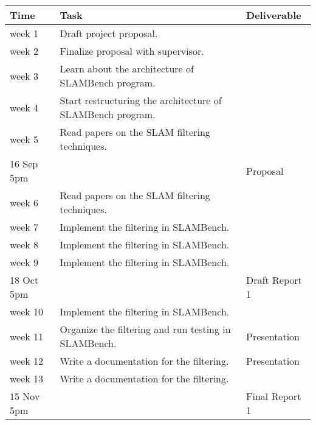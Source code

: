 \documentclass[11pt, oneside, a4paper]{article}
\begin{document}
\begin{center}
    \begin{tabular}{|l|l|l|} 
        \hline
        Time & Task & Deliverable\\
        \hline
        week 1 & Draft project proposal. & \\ 
        \hline
        week 2 & Finalize proposal with supervisor.& \\ 
        \hline
        week 3 & Learn about the architecture of SLAMBench program.&\\
        \hline
        week 4 & Start restructuring the architecture of SLAMBench program.&\\
        \hline
        week 5 & Read papers on the SLAM filtering techniques.&\\
        \hline 
        16 Sep 5pm & & Proposal\\
        \hline
        week 6 & Read papers on the SLAM filtering techniques.&\\
        \hline
        week 7 & Implement the filtering in SLAMBench.&\\
        \hline
        week 8 & Implement the filtering in SLAMBench.&\\
        \hline
        week 9 & Implement the filtering in SLAMBench.&\\
        \hline
        18 Oct 5pm & & Draft Report 1\\
        \hline
        week 10 & Implement the filtering in SLAMBench.&\\
        \hline
        week 11 & Organize the filtering and run testing in SLAMBench.& Presentation\\
        \hline
        week 12 & Write a documentation for the filtering.& Presentation\\
        \hline
        week 13 & Write a documentation for the filtering.&\\
        \hline
        15 Nov 5pm & & Final Report 1\\
        \hline
    \end{tabular}
\end{center}
\end{document}
